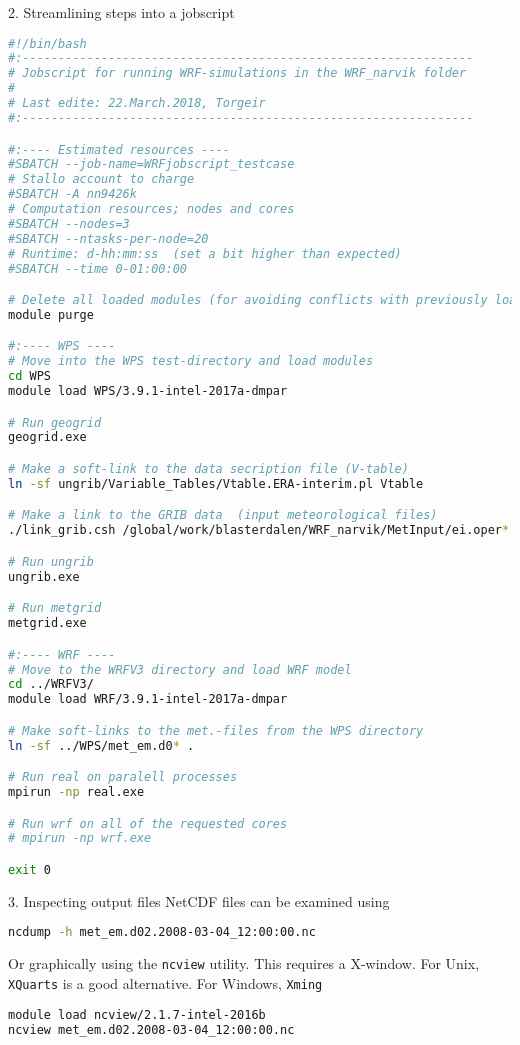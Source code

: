 \documentclass[xcolor=table]{beamer}
\begin{document}
\begin{frame}[fragile, allowframebreaks=.95, t]{2. Streamlining steps into a jobscript}
\begin{lstlisting}[backgroundcolor = \color{light-gray}, language=bash]
#!/bin/bash
#:---------------------------------------------------------------
# Jobscript for running WRF-simulations in the WRF_narvik folder 
#
# Last edite: 22.March.2018, Torgeir
#:---------------------------------------------------------------

#:---- Estimated resources ----
#SBATCH --job-name=WRFjobscript_testcase
# Stallo account to charge
#SBATCH -A nn9426k
# Computation resources; nodes and cores
#SBATCH --nodes=3
#SBATCH --ntasks-per-node=20
# Runtime: d-hh:mm:ss  (set a bit higher than expected)
#SBATCH --time 0-01:00:00

# Delete all loaded modules (for avoiding conflicts with previously loaded modules)
module purge

#:---- WPS ----
# Move into the WPS test-directory and load modules
cd WPS
module load WPS/3.9.1-intel-2017a-dmpar

# Run geogrid
geogrid.exe

# Make a soft-link to the data secription file (V-table)
ln -sf ungrib/Variable_Tables/Vtable.ERA-interim.pl Vtable

# Make a link to the GRIB data  (input meteorological files)
./link_grib.csh /global/work/blasterdalen/WRF_narvik/MetInput/ei.oper*

# Run ungrib
ungrib.exe

# Run metgrid
metgrid.exe

#:---- WRF ----
# Move to the WRFV3 directory and load WRF model
cd ../WRFV3/
module load WRF/3.9.1-intel-2017a-dmpar

# Make soft-links to the met.-files from the WPS directory
ln -sf ../WPS/met_em.d0* .

# Run real on paralell processes
mpirun -np real.exe

# Run wrf on all of the requested cores
# mpirun -np wrf.exe

exit 0
\end{lstlisting}
\end{frame}




\begin{frame}[fragile]{3. Inspecting output files}
NetCDF files can be examined using 
\begin{lstlisting}[backgroundcolor = \color{light-gray}, language=bash]
ncdump -h met_em.d02.2008-03-04_12:00:00.nc
\end{lstlisting}
Or graphically using the \texttt{ncview} utility. This requires a X-window. For Unix, \texttt{XQuarts} is a good alternative. For Windows, \texttt{Xming}
\begin{lstlisting}[backgroundcolor = \color{light-gray}, language=bash]
module load ncview/2.1.7-intel-2016b
ncview met_em.d02.2008-03-04_12:00:00.nc
\end{lstlisting}
\end{frame}
\end{document}
